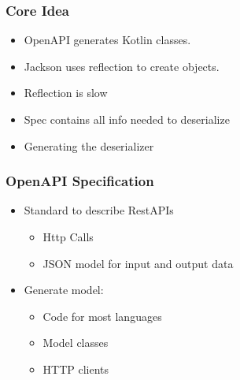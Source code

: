 \documentclass{beamer}
\begin{document}
\begin{frame}
\begin{columns}[c]
\begin{column}{.32\textwidth}
\begin{center}
                \end{center}
            \end{column}
        \end{columns}
    \end{frame}


    \begin{frame}
        \frametitle{Core Idea}
        \begin{itemize}
            \item OpenAPI generates Kotlin classes.
            \item Jackson uses reflection to create objects.
            \item Reflection is slow
            \item Spec contains all info needed to deserialize
            \item Generating the deserializer
        \end{itemize}
    \end{frame}


    \begin{frame}[fragile]
        \frametitle{OpenAPI Specification}
        \begin{itemize}
            \item Standard to describe RestAPIs
            \begin{itemize}
                \item Http Calls
                \item JSON model for input and output data
            \end{itemize}
            \item Generate model:
            \begin{itemize}
                \item Code for most languages
                \item Model classes
                \item HTTP clients
            \end{itemize}
        \end{itemize}
    \end{frame}
\end{document}
